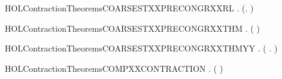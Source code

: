 \newcommand{\HOLContractionTheoremsCOARSESTXXPRECONGRXXLR}{\UseVerbatim{HOLContractionTheoremsCOARSESTXXPRECONGRXXLR}}
\begin{SaveVerbatim}{HOLContractionTheoremsCOARSESTXXPRECONGRXXRL}
\HOLTokenTurnstile{} \HOLSymConst{\HOLTokenForall{}} .
         \HOLSymConst{\HOLTokenConj{}}   \HOLSymConst{\HOLTokenImp{}}
       (\HOLSymConst{\HOLTokenForall{}}.  \HOLSymConst{\ensuremath{+}}    \HOLSymConst{\ensuremath{+}} ) \HOLSymConst{\HOLTokenImp{}}
         
\end{SaveVerbatim}
\newcommand{\HOLContractionTheoremsCOARSESTXXPRECONGRXXRL}{\UseVerbatim{HOLContractionTheoremsCOARSESTXXPRECONGRXXRL}}
\begin{SaveVerbatim}{HOLContractionTheoremsCOARSESTXXPRECONGRXXTHM}
\HOLTokenTurnstile{} \HOLSymConst{\HOLTokenForall{}} .
         \HOLSymConst{\HOLTokenConj{}}   \HOLSymConst{\HOLTokenImp{}}
       (   \HOLSymConst{\HOLTokenEquiv{}}   )
\end{SaveVerbatim}
\newcommand{\HOLContractionTheoremsCOARSESTXXPRECONGRXXTHM}{\UseVerbatim{HOLContractionTheoremsCOARSESTXXPRECONGRXXTHM}}
\begin{SaveVerbatim}{HOLContractionTheoremsCOARSESTXXPRECONGRXXTHMYY}
\HOLTokenTurnstile{} \HOLSymConst{\HOLTokenForall{}} .
         \HOLSymConst{\HOLTokenConj{}}   \HOLSymConst{\HOLTokenImp{}}
       (   \HOLSymConst{\HOLTokenEquiv{}} \HOLSymConst{\HOLTokenForall{}}.  \HOLSymConst{\ensuremath{+}}    \HOLSymConst{\ensuremath{+}} )
\end{SaveVerbatim}
\newcommand{\HOLContractionTheoremsCOARSESTXXPRECONGRXXTHMYY}{\UseVerbatim{HOLContractionTheoremsCOARSESTXXPRECONGRXXTHMYY}}
\begin{SaveVerbatim}{HOLContractionTheoremsCOMPXXCONTRACTION}
\HOLTokenTurnstile{} \HOLSymConst{\HOLTokenForall{}} .
         \HOLSymConst{\HOLTokenConj{}}   \HOLSymConst{\HOLTokenImp{}}
        (  )
\end{SaveVerbatim}
